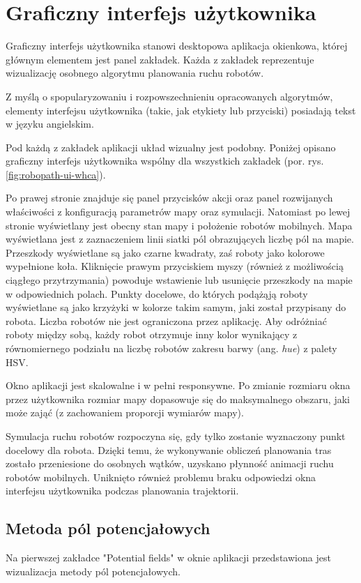 \section{Graficzny interfejs użytkownika}
Graficzny interfejs użytkownika stanowi desktopowa aplikacja okienkowa, której głównym elementem jest panel zakładek. Każda z zakładek reprezentuje wizualizację osobnego algorytmu planowania ruchu robotów.

Z myślą o spopularyzowaniu i rozpowszechnieniu opracowanych algorytmów, elementy interfejsu użytkownika (takie, jak etykiety lub przyciski) posiadają tekst w języku angielskim.

Pod każdą z zakładek aplikacji układ wizualny jest podobny. Poniżej opisano graficzny interfejs użytkownika wspólny dla wszystkich zakładek (por. rys. \ref{fig:robopath-ui-whca}).

Po prawej stronie znajduje się panel przycisków akcji oraz panel rozwijanych właściwości z konfiguracją parametrów mapy oraz symulacji. Natomiast po lewej stronie wyświetlany jest obecny stan mapy i położenie robotów mobilnych. Mapa wyświetlana jest z zaznaczeniem linii siatki pól obrazujących liczbę pól na mapie. Przeszkody wyświetlane są jako czarne kwadraty, zaś roboty jako kolorowe wypełnione koła.
Kliknięcie prawym przyciskiem myszy (również z możliwością ciągłego przytrzymania) powoduje wstawienie lub usunięcie przeszkody na mapie w odpowiednich polach.
Punkty docelowe, do których podążąją roboty wyświetlane są jako krzyżyki w kolorze takim samym, jaki został przypisany do robota. Liczba robotów nie jest ograniczona przez aplikację. Aby odróżniać roboty między sobą, każdy robot otrzymuje inny kolor wynikający z równomiernego podziału na liczbę robotów zakresu barwy (ang. {\it hue}) z palety HSV.

Okno aplikacji jest skalowalne i w pełni responsywne. Po zmianie rozmiaru okna przez użytkownika rozmiar mapy dopasowuje się do maksymalnego obszaru, jaki może zająć (z zachowaniem proporcji wymiarów mapy).

Symulacja ruchu robotów rozpoczyna się, gdy tylko zostanie wyznaczony punkt docelowy dla robota. Dzięki temu, że wykonywanie obliczeń planowania tras zostało przeniesione do osobnych wątków, uzyskano płynność animacji ruchu robotów mobilnych. Uniknięto również problemu braku odpowiedzi okna interfejsu użytkownika podczas planowania trajektorii.

\subsection{Metoda pól potencjałowych}
Na pierwszej zakładce "Potential fields" w oknie aplikacji przedstawiona jest wizualizacja metody pól potencjałowych.

